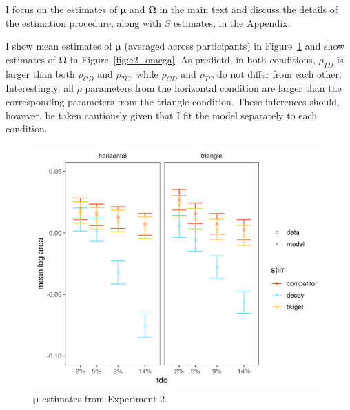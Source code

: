 I focus on the estimates of $\boldsymbol{\mu}$ and $\boldsymbol{\Omega}$ in the main text and discuss the details of the estimation procedure, along with $S$ estimates, in the Appendix. 

I show mean estimates of $\boldsymbol{\mu}$ (averaged across participants) in Figure~\ref{fig:e2mu} and show estimates of $\boldsymbol{\Omega}$ in Figure~\ref{fig:e2_omega}. As predictd, in both conditions, $\rho_{TD}$ is larger than both $\rho_{CD}$ and $\rho_{TC}$, while $\rho_{CD}$ and $\rho_{TC}$ do not differ from each other. Interestingly, all $\rho$ parameters from the horizontal condition are larger than the corresponding parameters from the triangle condition. These inferences should, however, be taken cautiously given that I fit the model separately to each condition.

\begin{figure}
   \includegraphics[width=\textwidth]{figures/bayes_circle_area_mu_sigma_constant_comp_effect_model_v_data_collapsed.jpeg}
   \caption{$\boldsymbol{\mu}$ estimates from Experiment 2.}
   \label{fig:e2mu}
\end{figure}

